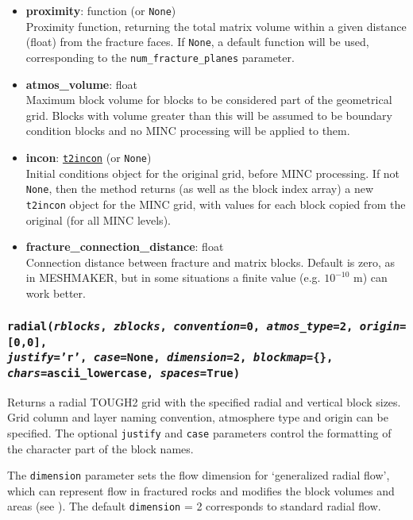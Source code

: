 \begin{itemize}
\item \textbf{proximity}: function (or \texttt{None})\\
  Proximity function, returning the total matrix volume within a given distance (float) from the fracture faces. If \texttt{None}, a default function will be used, corresponding to the \texttt{num\_fracture\_planes} parameter.
\item \textbf{atmos\_volume}: float\\
  Maximum block volume for blocks to be considered part of the geometrical grid. Blocks with volume greater than this will be assumed to be boundary condition blocks and no MINC processing will be applied to them.
\item \textbf{incon}: \hyperref[incons]{\texttt{t2incon}} (or \texttt{None})\\
  Initial conditions object for the original grid, before MINC processing. If not \texttt{None}, then the method returns (as well as the block index array) a new \texttt{t2incon} object for the MINC grid, with values for each block copied from the original (for all MINC levels).
\item \textbf{fracture\_connection\_distance}: float\\
  Connection distance between fracture and matrix blocks. Default is zero, as in MESHMAKER, but in some situations a finite value (e.g. $10^{-10}$ m) can work better.
\end{itemize}


\begin{snugshade}
\subsubsection{\texttt{radial(\emph{rblocks}, \emph{zblocks}, \emph{convention}=0, \emph{atmos\_type}=2, \emph{origin}=[0,0],\\
    \emph{justify}='r', \emph{case}=None, \emph{dimension}=2, \emph{blockmap}=\{\}, \emph{chars}=ascii\_lowercase, \emph{spaces}=\texttt{True})}}
\end{snugshade}
\label{sec:t2grid:radial}

Returns a radial TOUGH2 grid with the specified radial and vertical block sizes.  Grid column and layer naming convention, atmosphere type and origin can be specified.  The optional \texttt{justify} and \texttt{case} parameters control the formatting of the character part of the block names.

The \texttt{dimension} parameter sets the flow dimension for `generalized radial flow', which can represent flow in fractured rocks and modifies the block volumes and areas (see \cite{barker_1988}).  The default \texttt{dimension} = 2 corresponds to standard radial flow.

